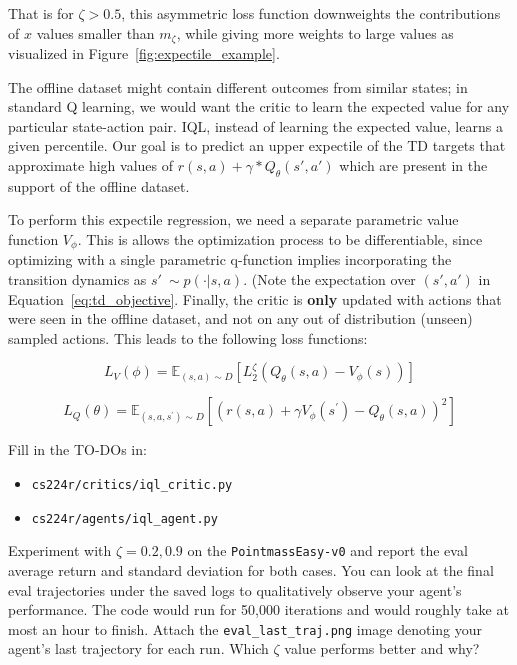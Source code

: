 \documentclass[12pt]{article}
\begin{document}
\begin{enumerate}
That is for $\zeta > 0.5$, this asymmetric loss function downweights the contributions of $x$ values smaller than $m_\zeta$, while giving more weights to large values as visualized in Figure~\ref{fig:expectile_example}.



The offline dataset might contain different outcomes from similar states; in standard Q learning, we would want the critic to learn the expected value for any particular state-action pair. IQL, instead of learning the expected value, learns a given percentile. Our goal is to predict an upper expectile of the TD targets that approximate high values of $r(s, a) + \gamma * Q_\theta(s', a')$ which are present in the support of the offline dataset.

 

To perform this expectile regression, we need a separate parametric value function $V_{\phi}$. This is allows the optimization process to be differentiable, since optimizing with a single parametric q-function implies incorporating the transition dynamics as $s' ~\sim p( \cdot |s, a)$. (Note the expectation over $(s', a')$ in Equation~\ref{eq:td_objective}. Finally, the critic is \textbf{only} updated with actions that were seen in the offline dataset, and not on any out of distribution (unseen) sampled actions. This leads to the following loss functions:

\begin{equation}
    L_V(\phi)=\mathbb{E}_{(s, a) \sim D}\left[L_2^\zeta\left(Q_\theta(s, a)-V_\phi(s)\right)\right]
\end{equation}

\begin{equation}
    L_Q(\theta)=\mathbb{E}_{\left(s, a, s^{\prime}\right) \sim D}\left[\left(r(s, a)+\gamma V_\phi\left(s^{\prime}\right)-Q_\theta(s, a)\right)^2\right]
\end{equation}

Fill in the TO-DOs in:
\begin{itemize}
    \item \texttt{cs224r/critics/iql\_critic.py}
    \item \texttt{cs224r/agents/iql\_agent.py}
\end{itemize}

Experiment with $\zeta = 0.2, 0.9$ on the \texttt{PointmassEasy-v0} and report the eval average return and standard deviation for both cases. You can look at the final eval trajectories under the saved logs to qualitatively observe your agent's performance. The code would run for 50,000 iterations and would roughly take at most an hour to finish.  Attach the \texttt{eval\_last\_traj.png} image denoting your agent's last trajectory for each run. Which $\zeta$ value performs better and why?




\end{enumerate}
\end{document}
